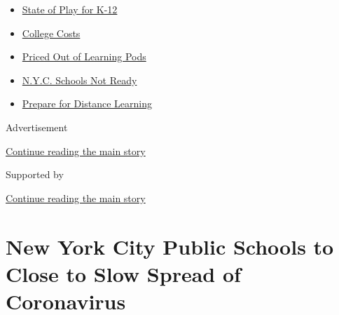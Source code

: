 \begin{itemize}
\tightlist
\item
  \href{https://www.nytimes3xbfgragh.onion/2020/08/17/us/k-12-schools-reopening.html?name=styln-coronavirus-schools-reopening\&region=TOP_BANNER\&variant=undefined\&block=storyline_menu_recirc\&action=click\&pgtype=Article\&impression_id=c12fe171-e108-11ea-860d-f9c39423259e}{State
  of Play for K-12}
\item
  \href{https://www.nytimes3xbfgragh.onion/2020/08/15/us/covid-college-tuition.html?name=styln-coronavirus-schools-reopening\&region=TOP_BANNER\&variant=undefined\&block=storyline_menu_recirc\&action=click\&pgtype=Article\&impression_id=c1300880-e108-11ea-860d-f9c39423259e}{College
  Costs}
\item
  \href{https://www.nytimes3xbfgragh.onion/2020/08/14/us/covid-schools-learning-pods.html?name=styln-coronavirus-schools-reopening\&region=TOP_BANNER\&variant=undefined\&block=storyline_menu_recirc\&action=click\&pgtype=Article\&impression_id=c1300881-e108-11ea-860d-f9c39423259e}{Priced
  Out of Learning Pods}
\item
  \href{https://www.nytimes3xbfgragh.onion/2020/08/14/nyregion/school-reopening-nyc.html?name=styln-coronavirus-schools-reopening\&region=TOP_BANNER\&variant=undefined\&block=storyline_menu_recirc\&action=click\&pgtype=Article\&impression_id=c1300882-e108-11ea-860d-f9c39423259e}{N.Y.C.
  Schools Not Ready}
\item
  \href{https://www.nytimes3xbfgragh.onion/2020/08/05/parenting/parents-distance-learning.html?name=styln-coronavirus-schools-reopening\&region=TOP_BANNER\&variant=undefined\&block=storyline_menu_recirc\&action=click\&pgtype=Article\&impression_id=c1300883-e108-11ea-860d-f9c39423259e}{Prepare
  for Distance Learning}
\end{itemize}

Advertisement

\protect\hyperlink{after-top}{Continue reading the main story}

Supported by

\protect\hyperlink{after-sponsor}{Continue reading the main story}

\hypertarget{new-york-city-public-schools-to-close-to-slow-spread-of-coronavirus}{%
\section{New York City Public Schools to Close to Slow Spread of
Coronavirus}\label{new-york-city-public-schools-to-close-to-slow-spread-of-coronavirus}}

